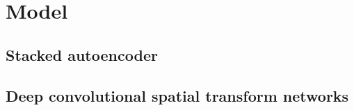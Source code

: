 
\chapter{Model}

\label{cha:mode}

\section{Stacked autoencoder}

\section{Deep convolutional spatial transform networks}
